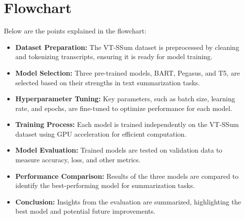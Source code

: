 \documentclass[conference]{IEEEtran}
\begin{document}
\section{Flowchart}
\noindent Below are the points explained in the flowchart:
\begin{itemize}
    \item \textbf{Dataset Preparation:} The VT-SSum dataset is preprocessed by cleaning and tokenizing transcripts, ensuring it is ready for model training.
    \item \textbf{Model Selection:} Three pre-trained models, BART, Pegasus, and T5, are selected based on their strengths in text summarization tasks.
    \item \textbf{Hyperparameter Tuning:} Key parameters, such as batch size, learning rate, and epochs, are fine-tuned to optimize performance for each model.
    \item \textbf{Training Process:} Each model is trained independently on the VT-SSum dataset using GPU acceleration for efficient computation.
    \item \textbf{Model Evaluation:} Trained models are tested on validation data to measure accuracy, loss, and other metrics.
    \item \textbf{Performance Comparison:} Results of the three models are compared to identify the best-performing model for summarization tasks.
    \item \textbf{Conclusion:} Insights from the evaluation are summarized, highlighting the best model and potential future improvements.
\end{itemize}
\begin{center}
\end{center}
\end{document}

